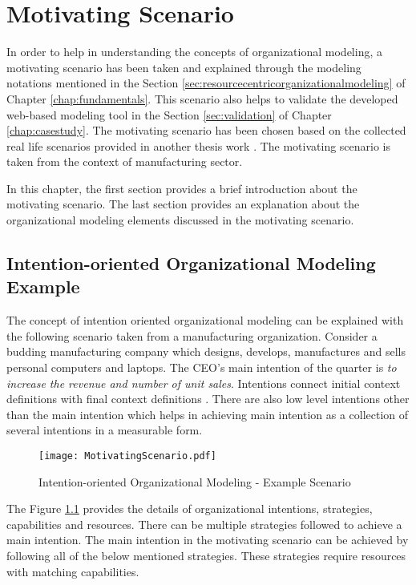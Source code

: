 \chapter{Motivating Scenario}
\label{chap:motivatingScenario}
In order to help in understanding the concepts of organizational modeling, a motivating scenario has been taken and explained through the modeling notations mentioned in the Section \ref{sec:resourcecentricorganizationalmodeling} of Chapter \ref{chap:fundamentals}. This scenario also helps to validate the developed web-based modeling tool in the Section \ref{sec:validation} of Chapter \ref{chap:casestudy}. The motivating scenario has been chosen based on the collected real life scenarios provided in another thesis work \cite{Sierr2015}. The motivating scenario is taken from the context of manufacturing sector. 

In this chapter, the first section provides a brief introduction about the motivating scenario. The last section provides an explanation about the organizational modeling elements discussed in the motivating scenario. 
\section{Intention-oriented Organizational Modeling Example}
\label{sec:scenario}
The concept of intention oriented organizational modeling can be explained with the following scenario taken from a manufacturing organization. Consider a budding manufacturing company which designs, develops, manufactures and sells personal computers and laptops. The CEO's main intention of the quarter is \textit{to increase the revenue and number of unit sales}. Intentions connect initial context definitions with final context definitions \cite{Sungur2014a}. There are also low level intentions other than the main intention which helps in achieving main intention as a collection of several intentions in a measurable form. 
 
  \begin{figure}
  	\centering
  	\texttt{[image: MotivatingScenario.pdf]}
  	\caption{Intention-oriented Organizational Modeling - Example Scenario}
  	\label{fig:motivatingscenario}
  \end{figure}
  
The Figure \ref{fig:motivatingscenario} provides the details of organizational intentions, strategies, capabilities and resources. There can be multiple strategies followed to achieve a main intention. The main intention in the motivating scenario can be achieved by following all of the below mentioned strategies. These strategies require resources with matching capabilities.
 
